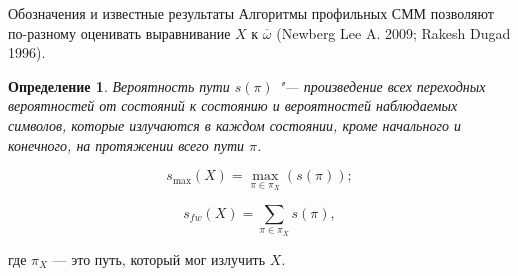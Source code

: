 \documentclass[ucs, notheorems, handout, 10pt]{beamer}
\newtheorem{defenition}{Определение}
\begin{document}
	\begin{frame}{Обозначения и известные результаты}				
		Алгоритмы профильных СММ позволяют по-разному оценивать выравнивание $X$ к $\overline{\omega}$ (Newberg Lee A. 2009; Rakesh Dugad 1996). 
		
		\begin{defenition}
			Вероятность пути $s(\pi)$ "--- произведение всех переходных вероятностей от состояний к состоянию и вероятностей наблюдаемых символов, которые излучаются в каждом состоянии, кроме начального и конечного, на протяжении всего пути $\pi$. 
		\end{defenition}		
		
		\begin{equation*}
			s_{\max}(X) = \underset{\pi \in \pi_{X}}{\max}(s(\pi)); \label{eq:1}
		\end{equation*}
		
		\begin{equation*}
			s_{fw}(X) = \sum_{\pi \in \pi_{X}}s(\pi), \label{eq:2}
		\end{equation*}
		
		где $\pi_{X}$ --- это путь, который мог излучить $X$.
		
	\end{frame}
	
\end{document}
